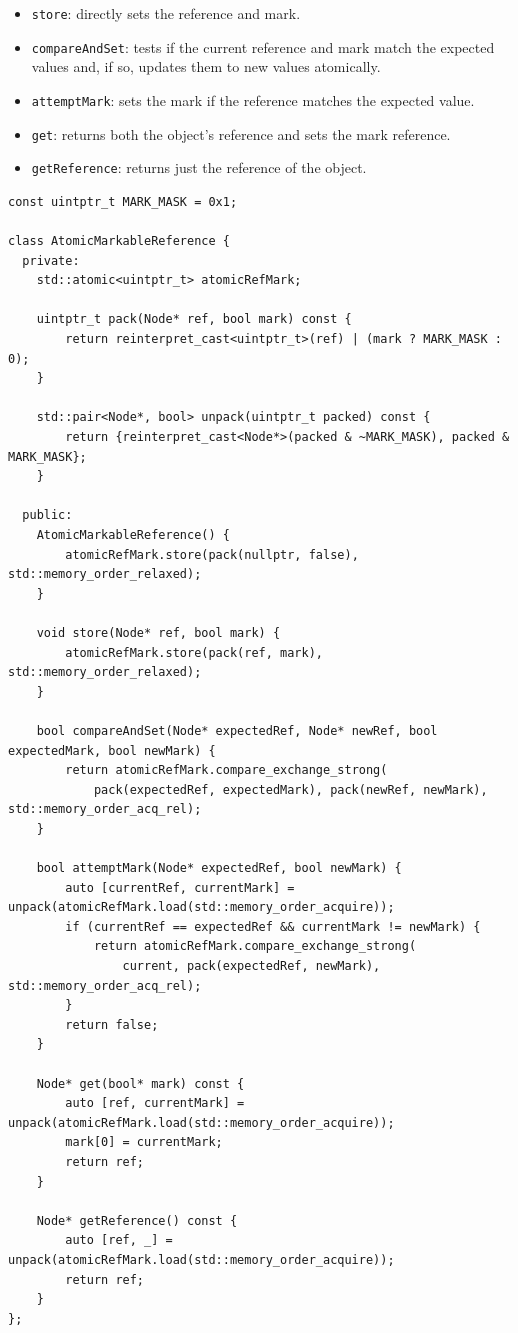 \begin{itemize} 
    \item \texttt{store}: directly sets the reference and mark.
    \item \texttt{compareAndSet}: tests if the current reference and mark match the expected values and, if so, updates them to new values atomically. 
    \item \texttt{attemptMark}: sets the mark if the reference matches the expected value.
    \item \texttt{get}: returns both the object's reference and sets the mark reference. 
    \item \texttt{getReference}: returns just the reference of the object.
\end{itemize}

\vspace{15pt}
    
\begin{lstlisting}[style=mystyle, caption=AtomicMarkableReference class implementation,label={}]
const uintptr_t MARK_MASK = 0x1;

class AtomicMarkableReference {
  private:
    std::atomic<uintptr_t> atomicRefMark;

    uintptr_t pack(Node* ref, bool mark) const {
        return reinterpret_cast<uintptr_t>(ref) | (mark ? MARK_MASK : 0);
    }

    std::pair<Node*, bool> unpack(uintptr_t packed) const {
        return {reinterpret_cast<Node*>(packed & ~MARK_MASK), packed & MARK_MASK};
    }
    
  public:
    AtomicMarkableReference() {
        atomicRefMark.store(pack(nullptr, false), std::memory_order_relaxed);
    }

    void store(Node* ref, bool mark) {
        atomicRefMark.store(pack(ref, mark), std::memory_order_relaxed);
    }

    bool compareAndSet(Node* expectedRef, Node* newRef, bool expectedMark, bool newMark) {
        return atomicRefMark.compare_exchange_strong(
            pack(expectedRef, expectedMark), pack(newRef, newMark), std::memory_order_acq_rel);
    }

    bool attemptMark(Node* expectedRef, bool newMark) {
        auto [currentRef, currentMark] = unpack(atomicRefMark.load(std::memory_order_acquire));
        if (currentRef == expectedRef && currentMark != newMark) {
            return atomicRefMark.compare_exchange_strong(
                current, pack(expectedRef, newMark), std::memory_order_acq_rel);
        }
        return false;
    }

    Node* get(bool* mark) const {
        auto [ref, currentMark] = unpack(atomicRefMark.load(std::memory_order_acquire));
        mark[0] = currentMark;
        return ref;
    }

    Node* getReference() const {
        auto [ref, _] = unpack(atomicRefMark.load(std::memory_order_acquire));
        return ref;
    }
};
\end{lstlisting}

